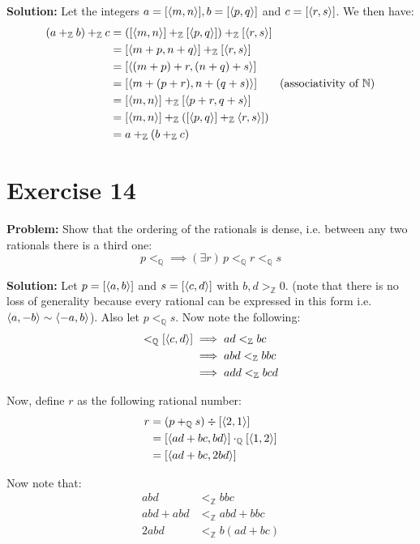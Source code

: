 \documentclass{article}
\begin{document}
\noindent\textbf{Solution:} Let the integers $a=[\langle m,n\rangle], b=[\langle p,q\rangle]$ and $c=[\langle r,s\rangle]$. We then have:
\begin{align*}
    (a+_\mathbb Zb)+_\mathbb Zc&=([\langle m,n\rangle]+_\mathbb Z[\langle p,q\rangle])+_\mathbb Z[\langle r,s\rangle]\\
    &=[\langle m+p,n+q\rangle]+_\mathbb Z[\langle r,s\rangle]\\
    &=[\langle(m+p)+r,(n+q)+s\rangle]\\
    &=[\langle m+(p+r),n+(q+s)\rangle]\tag{associativity of $\mathbb N$}\\
    &=[\langle m,n\rangle]+_\mathbb Z[\langle p+r,q+s\rangle]\\
    &=[\langle m,n\rangle]+_\mathbb Z([\langle p,q\rangle]+_\mathbb Z\langle r,s\rangle])\\
    &=a+_\mathbb Z(b+_\mathbb Zc)
\end{align*}

\section*{Exercise 14}
\noindent\textbf{Problem:} Show that the ordering of the rationals is dense, i.e. between any two rationals there is a third one:
\begin{equation*}
    p<_\mathbb Q\implies(\exists r)\,p<_\mathbb Qr<_\mathbb Qs
\end{equation*}
\smallskip

\noindent\textbf{Solution:} Let $p=[\langle a,b\rangle]$ and $s=[\langle c,d\rangle]$ with $b,d>_\mathbb Z 0$. (note that there is no loss of generality because every rational can be expressed in this form i.e. $\langle a,-b\rangle\sim\langle-a,b\rangle$). Also let $p<_\mathbb Q s$. Now note the following:
\begin{align*}
    [\pair{a}{b}]<_\mathbb Q [\pair{c}{d}]&\implies ad<_\mathbb Z bc\\
    &\implies abd<_\mathbb Z bbc\\
    &\implies add<_\mathbb Z bcd
\end{align*}

Now, define $r$ as the following rational number:
\begin{align*}
    r&=(p+_\mathbb Q s)\div[\langle2,1\rangle]\\
    &=[\langle ad+bc,bd\rangle]\cdot_\mathbb Q[\langle1,2\rangle]\\
    &=[\langle ad+bc,2bd\rangle]
\end{align*}

Now note that:
\begin{align*}
    abd&<_\mathbb Z bbc\\
    abd+abd&<_\mathbb Z abd+bbc\\
    2abd&<_\mathbb Z b(ad+bc)
\end{align*}
\end{document}
